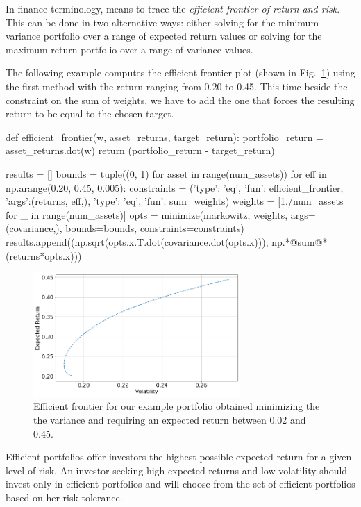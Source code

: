 In finance terminology, means to trace the \emph{efficient frontier of return and risk}. This can be done in two alternative ways: either solving for the minimum variance portfolio over a range of expected return values or solving for the maximum return portfolio over a range of variance values.

The following example computes the efficient frontier plot (shown in Fig.~\ref{fig:efficient_frontier}) using the first method with the return ranging from 0.20 to 0.45.
This time beside the constraint on the sum of weights, we have to add the one that forces the resulting return to be equal to the chosen target.

\begin{ipython}
def efficient_frontier(w, asset_returns, target_return):
    portfolio_return = asset_returns.dot(w)
    return (portfolio_return - target_return)

results = []
bounds = tuple((0, 1) for asset in range(num_assets))
for eff in np.arange(0.20, 0.45, 0.005):
    constraints = ({'type': 'eq', 'fun': efficient_frontier,
                    'args':(returns, eff,)},
                   {'type': 'eq', 'fun': sum_weights})
weights = [1./num_assets for _ in range(num_assets)]
opts = minimize(markowitz, weights, args=(covariance,),
                bounds=bounds, constraints=constraints)
results.append((np.sqrt(opts.x.T.dot(covariance.dot(opts.x))),
                np.*@sum@*(returns*opts.x)))
\end{ipython}

\begin{figure}[htb]
\centering
\includegraphics[width=0.7\textwidth]{figures/efficient_frontier}
\caption{Efficient frontier for our example portfolio obtained minimizing the the variance and requiring an expected return between 0.02 and 0.45.}
\label{fig:efficient_frontier}
\end{figure}

Efficient portfolios offer investors the highest possible expected return for a given level of risk. 
An investor seeking high expected returns and low volatility should invest only in efficient portfolios and will choose from the set of efficient portfolios based on her risk tolerance.
    
